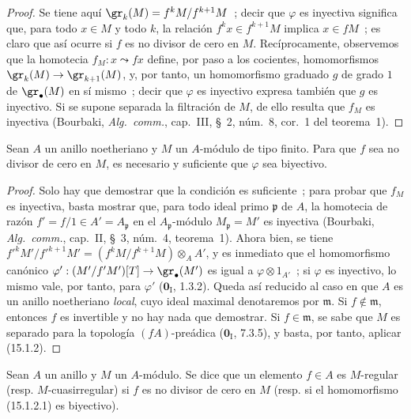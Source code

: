 \begin{proof}
Se tiene aquí $\gr_k(M)=f^kM/f^{k+1}M$~; decir que $\varphi$ es inyectiva
significa que, para todo $x\in M$ y todo $k$, la relación
$f^kx\in f^{k+1}M$ implica $x\in fM$~; es claro que así ocurre si $f$ es no
divisor de cero en $M$. Recíprocamente, observemos que la homotecia
$f_M:x\leadsto fx$ define, por paso a los cocientes, homomorfismos
$\gr_k(M)\to\gr_{k+1}(M)$, y, por tanto, un homomorfismo graduado $g$ de grado
$1$ de $\gr_\bullet(M)$ en sí mismo~; decir que $\varphi$ es inyectivo expresa
también que $g$ es inyectivo. Si se supone separada la filtración de $M$, de
ello resulta que $f_M$ es inyectiva (Bourbaki, \emph{Alg.~comm.}, cap.~III,
\S~2, núm.~8, cor.~1 del teorema~1).
\end{proof}

\begin{corollary}[15.1.3]
\label{0.15.1.3-fr}
Sean $A$ un anillo noetheriano y $M$ un $A$-módulo de tipo finito. Para que
$f$ sea no divisor de cero en $M$, es necesario y suficiente que $\varphi$ sea
biyectivo.
\end{corollary}

\begin{proof}
Solo hay que demostrar que la condición es suficiente~; para probar que $f_M$
es inyectiva, basta mostrar que, para todo ideal primo $\mathfrak p$ de $A$,
la homotecia de razón $f'=f/1\in A'=A_{\mathfrak p}$ en el
$A_{\mathfrak p}$-módulo $M_{\mathfrak p}=M'$ es inyectiva (Bourbaki,
\emph{Alg.~comm.}, cap.~II, \S~3, núm.~4, teorema~1). Ahora bien, se tiene
$f'^kM'/f'^{k+1}M'=(f^kM/f^{k+1}M)\otimes_A A'$, y es inmediato que
el homomorfismo canónico $\varphi':(M'/f'M')[T]\to\gr_\bullet(M')$ es igual a
$\varphi\otimes 1_{A'}$~; si $\varphi$ es inyectivo, lo mismo vale, por tanto,
para $\varphi'$ ($\mathbf{0}_{\mathrm I}$, 1.3.2). Queda así reducido al caso en que $A$
es un anillo noetheriano \emph{local}, cuyo ideal maximal denotaremos por
$\mathfrak m$. Si $f\notin\mathfrak m$, entonces $f$ es invertible y no hay
nada que demostrar. Si $f\in\mathfrak m$, se sabe que $M$ es separado para la
topología $(fA)$-preádica ($\mathbf{0}_{\mathrm I}$, 7.3.5), y basta, por tanto,
aplicar (15.1.2).
\end{proof}

\begin{definition}[15.1.4]
\label{0.15.1.4-fr}
Sean $A$ un anillo y $M$ un $A$-módulo. Se dice que un elemento $f\in A$ es
$M$-regular (\textup{resp.} $M$-cuasirregular) si $f$ es no divisor de
cero en $M$ (\textup{resp.} si el homomorfismo (15.1.2.1) es biyectivo).
\end{definition}

